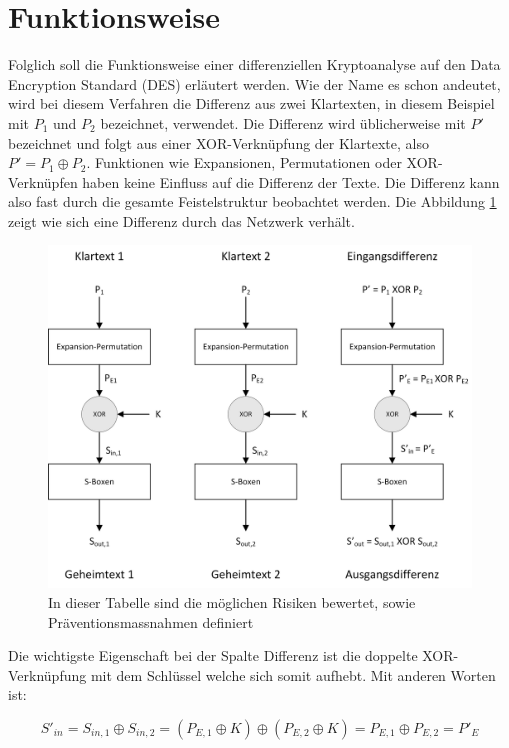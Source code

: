 \clearpage
\section{Funktionsweise}\label{sec:Funktionsweise}
Folglich soll die Funktionsweise einer differenziellen Kryptoanalyse auf den Data Encryption Standard (DES) erläutert werden. 
Wie der Name es schon andeutet, wird bei diesem Verfahren die Differenz aus zwei Klartexten, in diesem Beispiel mit $P_{1}$ und $P_{2}$ bezeichnet, verwendet. Die Differenz wird üblicherweise mit $P'$ bezeichnet und folgt aus einer XOR-Verknüpfung der Klartexte, also $P' = P_{1} \oplus P_{2}$.
Funktionen wie Expansionen, Permutationen oder XOR-Verknüpfen haben keine Einfluss auf die Differenz der Texte. Die Differenz kann also fast durch die gesamte Feistelstruktur beobachtet werden. Die Abbildung \ref{fig:DES_Differenz} zeigt wie sich eine Differenz durch das Netzwerk verhält. 

\begin{figure}[h]
	\centering
	\includegraphics[width=1.0\linewidth]{graphics/DES_Differenz.jpg}
	\caption{In dieser Tabelle sind die möglichen Risiken bewertet, sowie Präventionsmassnahmen definiert}
	\label{fig:DES_Differenz}
\end{figure}

Die wichtigste Eigenschaft bei der Spalte Differenz ist die doppelte XOR-Verknüpfung mit dem Schlüssel welche sich somit aufhebt. Mit anderen Worten ist: 

\begin{equation}\label{equ:Schluessel_Differenz}
S'_{in} = S_{in,1} \oplus S_{in,2} = (P_{E,1} \oplus K) \oplus (P_{E,2} \oplus K) = P_{E,1} \oplus P_{E,2} = P'_{E} 
\end{equation}


